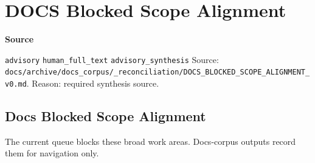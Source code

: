 \documentclass[9pt,a4paper,openany]{book}
\newcommand{\vonecallout}[3]{\par\medskip\noindent\begingroup\setlength{\fboxsep}{7pt}\colorbox{DomCalloutBg}{\parbox{0.94\linewidth}{\textbf{\textcolor{#1}{#2}}\par #3}}\endgroup\par\medskip}
\begin{document}
\section{DOCS Blocked Scope Alignment}

\vonecallout{DomSlate}{Source}{\texttt{advisory} \texttt{human\_\allowbreak{}full\_\allowbreak{}text} \texttt{advisory\_\allowbreak{}synthesis} Source: \texttt{docs/\allowbreak{}archive/\allowbreak{}docs\_\allowbreak{}corpus/\allowbreak{}\_\allowbreak{}reconciliation/\allowbreak{}DOCS\_\allowbreak{}BLOCKED\_\allowbreak{}SCOPE\_\allowbreak{}ALIGNMENT\_\allowbreak{}v0.\allowbreak{}md}.\allowbreak{} Reason: required synthesis source.\allowbreak{}}

\subsection{Docs Blocked Scope Alignment}

The current queue blocks these broad work areas.\allowbreak{} Docs-\allowbreak{}corpus outputs record them for navigation only.\allowbreak{}
\end{document}
